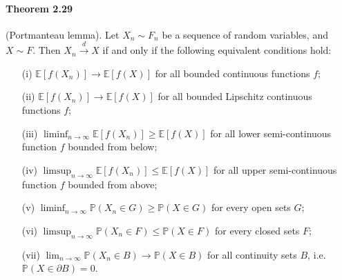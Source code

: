 \documentclass{article}
\numberwithin{equation}{section}
\newcommand{\E}{\mathbb{E}}
\renewcommand{\P}{\mathbb{P}}
\theoremstyle{plain}
\theoremstyle{definition}
\begin{document}
\paragraph{Theorem 2.29\label{thm:2.29}} (Portmanteau lemma). Let $X_n\sim F_n$ be a sequence of random variables, and $X\sim F$. Then $X_n\overset{d}{\to} X$ if and only if the following equivalent conditions hold:
\begin{itemize}
	\item[(i)] $\E[f(X_n)]\to\E[f(X)]$ for all bounded continuous functions $f$;
	\item[(ii)] $\E[f(X_n)]\to\E[f(X)]$ for all bounded Lipschitz continuous functions $f$;
	\item[(iii)] $\liminf_{n\to\infty}\E[f(X_n)]\geq\E[f(X)]$ for all lower semi-continuous function $f$ bounded from below;
	\item[(iv)] $\limsup_{n\to\infty}\E[f(X_n)]\leq\E[f(X)]$ for all upper semi-continuous function $f$ bounded from above;
	\item[(v)] $\liminf_{n\to\infty}\P(X_n\in G)\geq\P(X\in G)$ for every open sets $G$;
	\item[(vi)] $\limsup_{n\to\infty}\P(X_n\in F)\leq\P(X\in F)$ for every closed sets $F$;
	\item[(vii)] $\lim_{n\to\infty}\P(X_n\in B)\to\P(X\in B)$ for all continuity sets $B$, i.e. $\P(X\in\partial B)=0$. 
\end{itemize}
\end{document}
